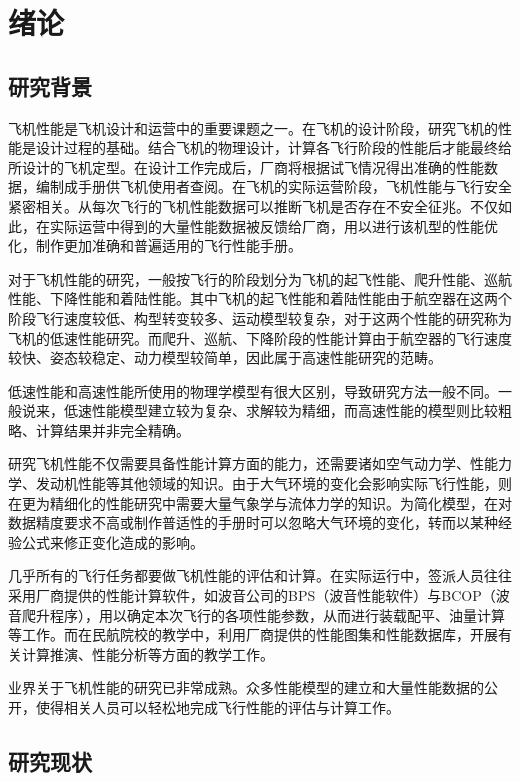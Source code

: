 \documentclass[a4paper,punct,space,heading=true,AutoFakeBold]{ctexrep}
\begin{document}
\setlength{\headsep}{0.624cm}
\pagestyle{fancy}
\setlength{\baselineskip}{20pt}
\chapter{绪论}
\setlength{\baselineskip}{20pt}
\section{研究背景}

飞机性能是飞机设计和运营中的重要课题之一。在飞机的设计阶段，研究飞机的性能是设计过程的基础。结合飞机的物理设计，计算各飞行阶段的性能后才能最终给所设计的飞机定型。在设计工作完成后，厂商将根据试飞情况得出准确的性能数据，编制成手册供飞机使用者查阅。在飞机的实际运营阶段，飞机性能与飞行安全紧密相关。从每次飞行的飞机性能数据可以推断飞机是否存在不安全征兆。不仅如此，在实际运营中得到的大量性能数据被反馈给厂商，用以进行该机型的性能优化，制作更加准确和普遍适用的飞行性能手册。

对于飞机性能的研究，一般按飞行的阶段划分为飞机的起飞性能、爬升性能、巡航性能、下降性能和着陆性能。其中飞机的起飞性能和着陆性能由于航空器在这两个阶段飞行速度较低、构型转变较多、运动模型较复杂，对于这两个性能的研究称为飞机的低速性能研究。而爬升、巡航、下降阶段的性能计算由于航空器的飞行速度较快、姿态较稳定、动力模型较简单，因此属于高速性能研究的范畴。

低速性能和高速性能所使用的物理学模型有很大区别，导致研究方法一般不同。一般说来，低速性能模型建立较为复杂、求解较为精细，而高速性能的模型则比较粗略、计算结果并非完全精确。

研究飞机性能不仅需要具备性能计算方面的能力，还需要诸如空气动力学、性能力学、发动机性能等其他领域的知识。由于大气环境的变化会影响实际飞行性能，则在更为精细化的性能研究中需要大量气象学与流体力学的知识。为简化模型，在对数据精度要求不高或制作普适性的手册时可以忽略大气环境的变化，转而以某种经验公式来修正变化造成的影响。

几乎所有的飞行任务都要做飞机性能的评估和计算。在实际运行中，签派人员往往采用厂商提供的性能计算软件，如波音公司的BPS（波音性能软件）与BCOP（波音爬升程序），用以确定本次飞行的各项性能参数，从而进行装载配平、油量计算等工作。而在民航院校的教学中，利用厂商提供的性能图集和性能数据库，开展有关计算推演、性能分析等方面的教学工作。

业界关于飞机性能的研究已非常成熟。众多性能模型的建立和大量性能数据的公开，使得相关人员可以轻松地完成飞行性能的评估与计算工作。

\section{研究现状}
\end{document}
